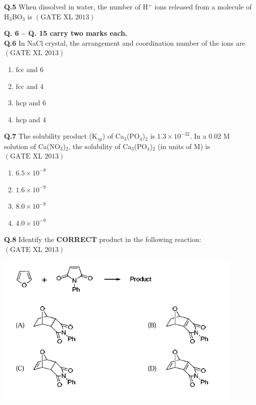 \documentclass[12pt]{article}
\theoremstyle{remark}
\providecommand{\brak}[1]{\ensuremath{\left(#1\right)}}
\begin{document}
\textbf{Q.5} When dissolved in water, the number of H$^+$ ions released from a molecule of H$_3$BO$_3$ is \underline{\hspace{2cm}}\hfill $\brak{\text{GATE XL 2013}}$

\noindent\textbf{Q. 6 – Q. 15 carry two marks each.}\\

\textbf{Q.6} In NaCl crystal, the arrangement and coordination number of the ions are\hfill $\brak{\text{GATE XL 2013}}$
\begin{enumerate}
    \item fcc and 6
    \item fcc and 4
    \item hcp and 6
    \item hcp and 4
\end{enumerate}

\textbf{Q.7} The solubility product (K$_{sp}$) of Ca$_3$(PO$_4$)$_2$ is $1.3 \times 10^{-32}$. In a $0.02$ M solution of Ca(NO$_3$)$_2$, the solubility of Ca$_3$(PO$_4$)$_2$ (in units of M) is\hfill $\brak{\text{GATE XL 2013}}$
\begin{enumerate}
    \item $6.5 \times 10^{-9}$
    \item $1.6 \times 10^{-9}$
    \item $8.0 \times 10^{-9}$
    \item $4.0 \times 10^{-9}$
\end{enumerate}

\textbf{Q.8} Identify the \textbf{CORRECT} product in the following reaction:\hfill $\brak{\text{GATE XL 2013}}$
\begin{center}
    \includegraphics[width=0.9\textwidth]{figs/xl_2013 que8 ch.png}
\end{center}
\end{document}

